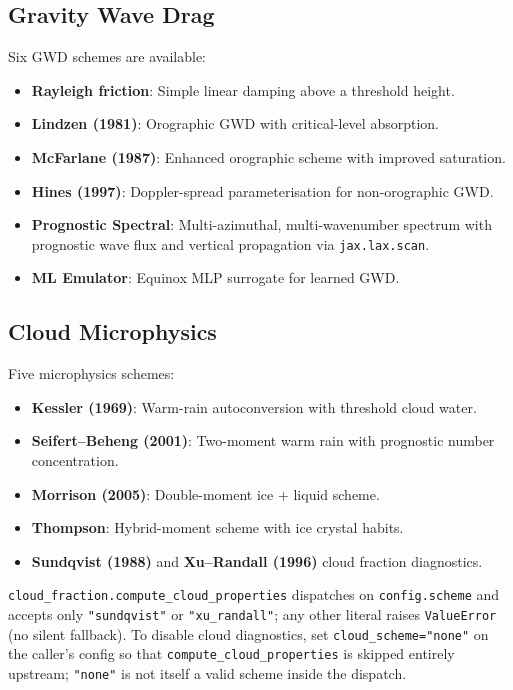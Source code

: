 \documentclass[11pt,a4paper]{article}
\begin{document}
\subsection{Gravity Wave Drag}

Six GWD schemes are available:
\begin{itemize}[nosep]
  \item \textbf{Rayleigh friction}: Simple linear damping above a threshold height.
  \item \textbf{Lindzen (1981)}: Orographic GWD with critical-level absorption.
  \item \textbf{McFarlane (1987)}: Enhanced orographic scheme with improved saturation.
  \item \textbf{Hines (1997)}: Doppler-spread parameterisation for non-orographic GWD.
  \item \textbf{Prognostic Spectral}: Multi-azimuthal, multi-wavenumber spectrum with prognostic wave flux and vertical propagation via \texttt{jax.lax.scan}.
  \item \textbf{ML Emulator}: Equinox MLP surrogate for learned GWD.
\end{itemize}

\subsection{Cloud Microphysics}

Five microphysics schemes:
\begin{itemize}[nosep]
  \item \textbf{Kessler (1969)}: Warm-rain autoconversion with threshold cloud water.
  \item \textbf{Seifert--Beheng (2001)}: Two-moment warm rain with prognostic number concentration.
  \item \textbf{Morrison (2005)}: Double-moment ice + liquid scheme.
  \item \textbf{Thompson}: Hybrid-moment scheme with ice crystal habits.
  \item \textbf{Sundqvist (1988)} and \textbf{Xu--Randall (1996)} cloud fraction diagnostics.
\end{itemize}
\texttt{cloud\_fraction.compute\_cloud\_properties} dispatches on
\texttt{config.scheme} and accepts only \texttt{"sundqvist"} or
\texttt{"xu\_randall"}; any other literal raises \texttt{ValueError}
(no silent fallback).  To disable cloud diagnostics, set
\texttt{cloud\_scheme="none"} on the caller's config so that
\texttt{compute\_cloud\_properties} is skipped entirely upstream;
\texttt{"none"} is not itself a valid scheme inside the dispatch.
\end{document}
